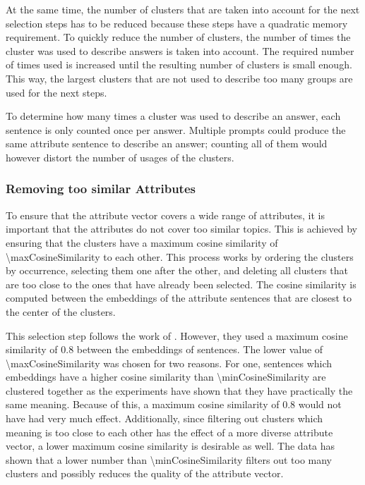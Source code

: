 At the same time, the number of clusters that are taken into account for the next selection steps has to be reduced because these steps have a quadratic memory requirement. To quickly reduce the number of clusters, the number of times the cluster was used to describe answers is taken into account. The required number of times used is increased until the resulting number of clusters is small enough. This way, the largest clusters that are not used to describe too many groups are used for the next steps.

To determine how many times a cluster was used to describe an answer, each sentence is only counted once per answer. Multiple prompts could produce the same attribute sentence to describe an answer; counting all of them would however distort the number of usages of the clusters.

\subsubsection{Removing too similar Attributes}
\label{sec:experiments:setup:selection:removeSimilar}
To ensure that the attribute vector covers a wide range of attributes, it is important that the attributes do not cover too similar topics. This is achieved by ensuring that the clusters have a maximum cosine similarity of \num{\maxCosineSimilarity} to each other. This process works by ordering the clusters by occurrence, selecting them one after the other, and deleting all clusters that are too close to the ones that have already been selected.
The cosine similarity is computed between the embeddings of the attribute sentences that are closest to the center of the clusters.

This selection step follows the work of \citet{patelLearningInterpretableStyle2023}. However, they used a maximum cosine similarity of \num{0.8} between the embeddings of sentences. The lower value of \num{\maxCosineSimilarity} was chosen for two reasons. For one, sentences which embeddings have a higher cosine similarity than \num{\minCosineSimilarity} are clustered together as the experiments have shown that they have practically the same meaning. Because of this, a maximum cosine similarity of \num{0.8} would not have had very much effect. Additionally, since filtering out clusters which meaning is too close to each other has the effect of a more diverse attribute vector, a lower maximum cosine similarity is desirable as well. The data has shown that a lower number than \num{\minCosineSimilarity} filters out too many clusters and possibly reduces the quality of the attribute vector. %



